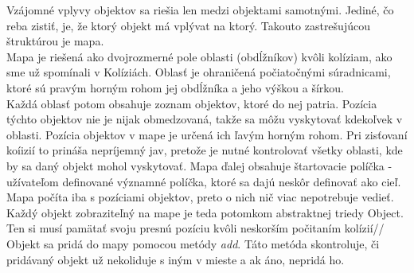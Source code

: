 Vzájomné vplyvy objektov sa riešia len medzi objektami samotnými. Jediné, čo reba zistiť, je, že ktorý objekt má vplývat na ktorý. Takouto zastrešujúcou štruktúrou  je mapa.\\
Mapa je riešená ako dvojrozmerné pole oblasti (obdĺžníkov) kvôli kolíziam, ako sme už spomínali v Kolíziách.  Oblasť je ohraničená počiatočnými súradnicami, ktoré sú pravým horným rohom jej obdĺžníka a jeho výškou a šírkou.\\
Každá oblasť potom obsahuje zoznam objektov, ktoré do nej patria. Pozícia týchto objektov nie je nijak obmedzovaná, takže sa môžu vyskytovať kdekoľvek v oblasti. Pozícia objektov v mape je určená ich ľavým horným rohom. Pri zisťovaní koíizií to prináša  nepríjemný jav, pretože je nutné kontrolovať všetky oblasti, kde by sa daný objekt mohol vyskytovať. Mapa ďalej obsahuje štartovacie políčka - užívateľom definované významné políčka, ktoré sa dajú neskôr definovať ako cieľ. \\

Mapa počíta iba s pozíciami objektov, preto o nich nič viac nepotrebuje vedieť. Každý objekt zobraziteľný na mape je teda potomkom abstraktnej triedy Object. Ten si musí pamätať svoju presnú pozíciu kvôli neskorším počitaním kolízií//
Objekt sa pridá do mapy pomocou metódy {\it add}. Táto metóda skontroluje, či pridávaný objekt už nekoliduje s iným v mieste a ak áno, nepridá ho. \\ %


